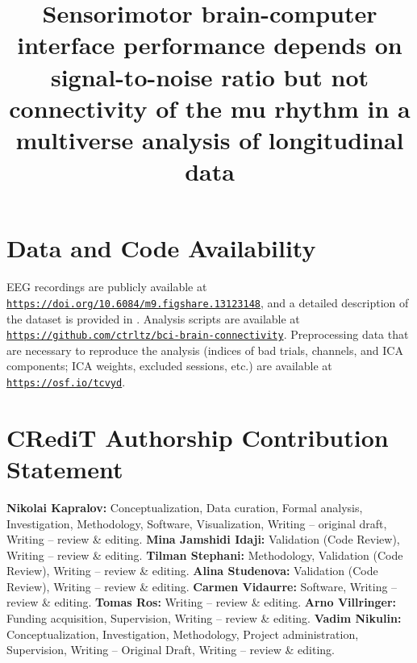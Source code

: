 \documentclass[preprint,authoryear,semicolon,12pt]{elsarticle}
\begin{document}
\begin{frontmatter}


\title{Sensorimotor brain-computer interface performance depends on signal-to-noise ratio but not connectivity of the mu rhythm in a multiverse analysis of longitudinal data}


    

\begin{abstract}
    
\end{abstract}

\end{frontmatter}


\newpage











\section*{Data and Code Availability}

EEG recordings are publicly available at \texttt{\url{https://doi.org/10.6084/m9.figshare.13123148}}, and a detailed description of the dataset is provided in \citep{Stieger2020_analysis, Stieger2021_dataset}. Analysis scripts are available at \texttt{\url{https://github.com/ctrltz/bci-brain-connectivity}}. Preprocessing data that are necessary to reproduce the analysis (indices of bad trials, channels, and ICA components; ICA weights, excluded sessions, etc.) are available at \texttt{\url{https://osf.io/tcvyd}}.

\section*{CRediT Authorship Contribution Statement}

\textbf{Nikolai Kapralov:} Conceptualization, Data curation, Formal analysis, Investigation, Methodology, Software, Visualization, Writing – original draft, Writing – review \& editing. \textbf{Mina Jamshidi Idaji:} Validation (Code Review), Writing – review \& editing. \textbf{Tilman Stephani:} Methodology, Validation (Code Review), Writing – review \& editing. \textbf{Alina Studenova:} Validation (Code Review), Writing – review \& editing. \textbf{Carmen Vidaurre:} Software, Writing – review \& editing. \textbf{Tomas Ros:} Writing – review \& editing. \textbf{Arno Villringer:} Funding acquisition, Supervision, Writing – review \& editing. \textbf{Vadim Nikulin:} Conceptualization, Investigation, Methodology, Project administration, Supervision, Writing – Original Draft, Writing – review \& editing.
\end{document}
